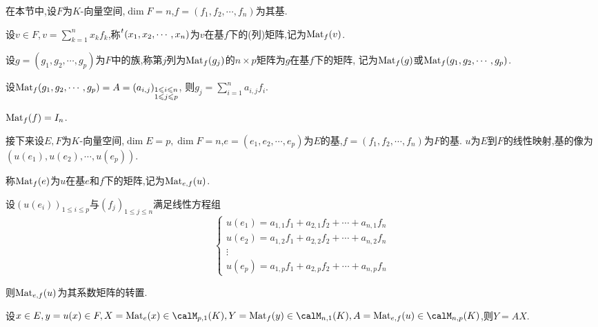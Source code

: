 在本节中,设$F$为$K$-向量空间,$\dim F = n$,$f = (f_1, f_2, \cdots, f_n)$为其基.

\begin{deff}
    设$v \in F, v = \sum\limits_{k = 1}^n x_k f_k$,称$\prescript{t}{}{(x_1, x_2, \cdots, x_n)}$为$v$在基$f$下的(列)矩阵,记为$\operatorname{Mat}_f(v)$.
\end{deff}

\begin{deff}
    设$g = (g_1, g_2, \cdots, g_p)$为$F$中的族,称第$j$列为$\operatorname{Mat}_f(g_j)$的$n \times p$矩阵为$g$在基$f$下的矩阵,
    记为$\operatorname{Mat}_f(g)$或$\operatorname{Mat}_f(g_1, g_2, \cdots, g_p)$.
\end{deff}

\begin{rqq}
    设$\operatorname{Mat}_f(g_1, g_2, \cdots, g_p) = A = (a_{i, j})_{\substack{1 \leqslant i \leqslant n \\ 1 \leqslant j \leqslant p}}$,
    则$g_j = \sum\limits_{i = 1}^n a_{i, j} f_i$.
\end{rqq}

\begin{rqq}
    $\operatorname{Mat}_f(f) = I_n$.
\end{rqq}

接下来设$E, F$为$K$-向量空间,$\dim E = p, \dim F = n$,$e = (e_1, e_2, \cdots, e_p)$为$E$的基,$f = (f_1, f_2, \cdots, f_n)$为$F$的基.
$u$为$E$到$F$的线性映射,基的像为$(u(e_1), u(e_2), \cdots, u(e_p))$.

\begin{deff}
    称$\operatorname{Mat}_f(e)$为$u$在基$e$和$f$下的矩阵,记为$\operatorname{Mat}_{e,f}(u)$.
\end{deff}

\begin{rqq}
    设$(u(e_i))_{1 \leqslant i \leqslant p}$与$(f_j)_{1 \leqslant j \leqslant n}$满足线性方程组
    \[ \begin{cases}
        u(e_1) = a_{1, 1}f_1 + a_{2, 1}f_2 + \cdots + a_{n, 1}f_n \\
        u(e_2) = a_{1, 2}f_1 + a_{2, 2}f_2 + \cdots + a_{n, 2}f_n \\
        \vdots \\
        u(e_p) = a_{1, p}f_1 + a_{2, p}f_2 + \cdots + a_{n, p}f_n
    \end{cases} \]

    则$\operatorname{Mat}_{e, f}(u)$为其系数矩阵的转置.
\end{rqq}

\begin{prop}
    设$x \in E, y = u(x) \in F, X = \mat_e(x) \in \calM_{p, 1}(K), Y = \mat_f(y) \in \calM_{n, 1}(K),
    A = \mat_{e, f}(u) \in \calM_{n, p}(K)$,则$Y = AX$.
\end{prop}

